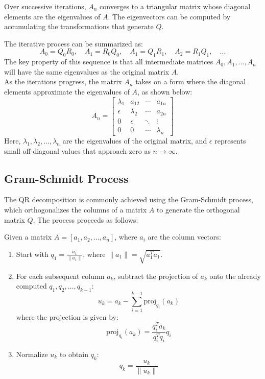 \documentclass[journal,12pt,onecolumn]{IEEEtran}
\theoremstyle{remark}
\begin{document}
Over successive iterations, \( A_n \) converges to a triangular matrix whose diagonal elements are the eigenvalues of \( A \). The eigenvectors can be computed by accumulating the transformations that generate \( Q \).

The iterative process can be summarized as:
\[
A_0 = Q_0 R_0, \quad A_1 = R_0 Q_0, \quad A_1 = Q_1 R_1, \quad A_2 = R_1 Q_1, \quad \dots
\]
The key property of this sequence is that all intermediate matrices \( A_0, A_1, \dots, A_n \) will have the same eigenvalues as the original matrix \( A \). \\

As the iterations progress, the matrix \( A_n \) takes on a form where the diagonal elements approximate the eigenvalues of \( A \), as shown below:
\[
A_n = 
\begin{bmatrix}
	\lambda_1 & a_{12} & \cdots & a_{1n} \\
	\epsilon & \lambda_2 & \cdots & a_{2n} \\
	0 & \epsilon & \ddots & \vdots \\
	0 & 0 & \cdots & \lambda_n
\end{bmatrix}
\]
Here, \( \lambda_1, \lambda_2, \dots, \lambda_n \) are the eigenvalues of the original matrix, and \( \epsilon \) represents small off-diagonal values that approach zero as \( n \to \infty \).

	
\subsection{Gram-Schmidt Process}
	The QR decomposition is commonly achieved using the Gram-Schmidt process, which orthogonalizes the columns of a matrix \( A \) to generate the orthogonal matrix \( Q \). The process proceeds as follows:
	
	Given a matrix \( A = [a_1, a_2, \ldots, a_n] \), where \( a_i \) are the column vectors:
	\begin{enumerate}
		\item Start with \( q_1 = \frac{a_1}{\|a_1\|} \), where \( \|a_1\| = \sqrt{a_1^T a_1} \).
		\item For each subsequent column \( a_k \), subtract the projection of \( a_k \) onto the already computed \( q_1, q_2, \ldots, q_{k-1} \):
		\[
		u_k = a_k - \sum_{i=1}^{k-1} \text{proj}_{q_i}(a_k)
		\]
		where the projection is given by:
		\[
		\text{proj}_{q_i}(a_k) = \frac{q_i^T a_k}{q_i^T q_i} q_i
		\]
		\item Normalize \( u_k \) to obtain \( q_k \):
		\[
		q_k = \frac{u_k}{\|u_k\|}
		\]
	\end{enumerate}
	
\end{document}
